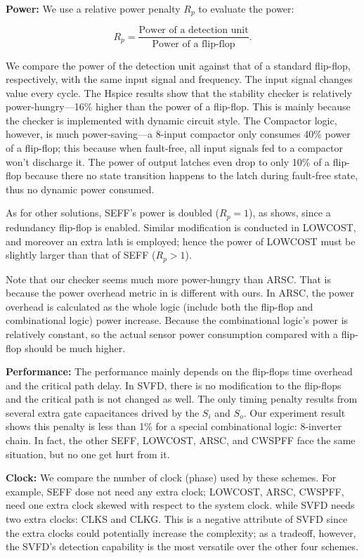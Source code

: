 {\bf Power:} We use a relative power penalty $R_p$ to evaluate the power:

\begin{equation}
  R_p=\frac{\mbox{Power of a detection unit}}{\mbox{Power of a flip-flop}}.
\end{equation}

We compare the power of the detection unit against that of a standard flip-flop, respectively, with the same input signal and frequency. The input signal changes value every cycle. The Hspice results show that the stability checker is relatively power-hungry---16\% higher than the power of a flip-flop.  This is mainly because the checker is implemented with dynamic circuit style. The Compactor logic, however, is much power-saving---a 8-input compactor only consumes 40\% power of a flip-flop; this because when fault-free, all input signals fed to a compactor won't discharge it. The power of output latches even drop to only 10\% of a flip-flop because there no state transition happens to the latch during fault-free state, thus no dynamic power consumed.

As for other solutions,  SEFF's power is doubled ($R_p=1$), as \cite{Mitra_C05} shows, since a redundancy flip-flop is enabled. Similar modification is conducted in LOWCOST, and moreover an extra lath is employed; hence the power of LOWCOST must be slightly larger than that of SEFF ($R_p>1$).

Note that our checker seems much more power-hungry than ARSC. That is because the power overhead metric in \cite{agarwal2007circuit} is different with ours. In ARSC, the power overhead is calculated as the whole logic (include both the flip-flop and combinational logic) power increase. Because the combinational logic's power is relatively constant, so the actual sensor power consumption compared with a flip-flop should be much higher.

{\bf Performance:} The performance mainly depends on the flip-flops time overhead and the critical path delay. In SVFD, there is no modification to the flip-flops and the critical path is not changed as well. The only timing penalty results from several extra gate capacitances drived by the $S_i$ and $S_o$. Our experiment result shows this penalty is less than 1\% for a special combinational logic: 8-inverter chain.  In fact, the other SEFF, LOWCOST, ARSC, and CWSPFF face the same situation, but no one get hurt from it.

{\bf Clock:} We compare the number of clock (phase) used by these schemes. For example, SEFF dose not need any extra clock; LOWCOST, ARSC, CWSPFF, need one extra clock skewed with respect to the system clock. while SVFD needs two extra clocks: CLKS and CLKG. This is a negative attribute of SVFD since the extra clocks could potentially increase the complexity; as a tradeoff, however, the SVFD's detection capability is the most versatile over the other four schemes.

